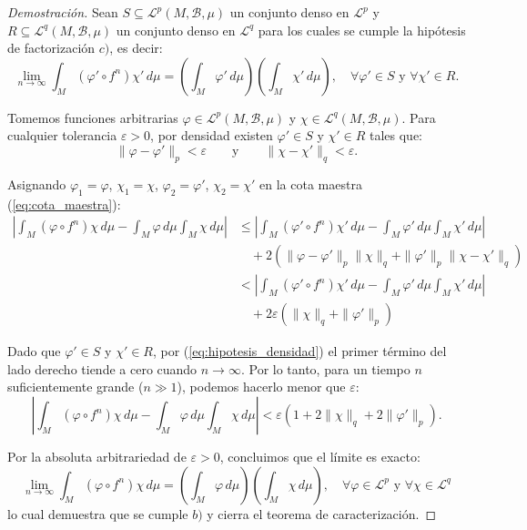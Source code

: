 \begin{proof}[Demostración]
	Sean $S \subseteq \mathcal{L}^p(M, \mathcal{B}, \mu)$ un conjunto denso en $\mathcal{L}^p$ y $R \subseteq \mathcal{L}^q(M, \mathcal{B}, \mu)$ un conjunto denso en $\mathcal{L}^q$ para los cuales se cumple la hipótesis de factorización $c)$, es decir:
	\begin{equation}
		\lim_{n \to \infty} \int_M (\varphi' \circ f^n)\chi' \, d\mu = \left( \int_M \varphi' \, d\mu \right) \left( \int_M \chi' \, d\mu \right), \quad \forall \varphi' \in S \text{ y } \forall \chi' \in R. \label{eq:hipotesis_densidad}
	\end{equation}
	
	Tomemos funciones arbitrarias $\varphi \in \mathcal{L}^p(M, \mathcal{B}, \mu)$ y $\chi \in \mathcal{L}^q(M, \mathcal{B}, \mu)$. Para cualquier tolerancia $\varepsilon > 0$, por densidad existen $\varphi' \in S$ y $\chi' \in R$ tales que:
	$$ \|\varphi - \varphi'\|_p < \varepsilon \qquad \text{y} \qquad \|\chi - \chi'\|_q < \varepsilon. $$
	
	Asignando $\varphi_1 = \varphi$, $\chi_1 = \chi$, $\varphi_2 = \varphi'$, $\chi_2 = \chi'$ en la cota maestra (\ref{eq:cota_maestra}):
	\begin{align*}
		\left| \int_M (\varphi \circ f^n)\chi \, d\mu - \int_M \varphi \, d\mu \int_M \chi \, d\mu \right| &\le \left| \int_M (\varphi' \circ f^n)\chi' \, d\mu - \int_M \varphi' \, d\mu \int_M \chi' \, d\mu \right| \\
		&\quad + 2\left( \|\varphi - \varphi'\|_p \|\chi\|_q + \|\varphi'\|_p \|\chi - \chi'\|_q \right) \\
		&< \left| \int_M (\varphi' \circ f^n)\chi' \, d\mu - \int_M \varphi' \, d\mu \int_M \chi' \, d\mu \right| \\
		&\quad + 2\varepsilon\left( \|\chi\|_q + \|\varphi'\|_p \right)
	\end{align*}
	
	Dado que $\varphi' \in S$ y $\chi' \in R$, por (\ref{eq:hipotesis_densidad}) el primer término del lado derecho tiende a cero cuando $n \to \infty$. Por lo tanto, para un tiempo $n$ suficientemente grande ($n \gg 1$), podemos hacerlo menor que $\varepsilon$:
	$$ \left| \int_M (\varphi \circ f^n)\chi \, d\mu - \int_M \varphi \, d\mu \int_M \chi \, d\mu \right| < \varepsilon \left( 1 + 2\|\chi\|_q + 2\|\varphi'\|_p \right). $$
	
	Por la absoluta arbitrariedad de $\varepsilon > 0$, concluimos que el límite es exacto:
	$$ \lim_{n \to \infty} \int_M (\varphi \circ f^n)\chi \, d\mu = \left( \int_M \varphi \, d\mu \right) \left( \int_M \chi \, d\mu \right), \quad \forall \varphi \in \mathcal{L}^p \text{ y } \forall \chi \in \mathcal{L}^q $$
	lo cual demuestra que se cumple $b)$ y cierra el teorema de caracterización.
\end{proof}

